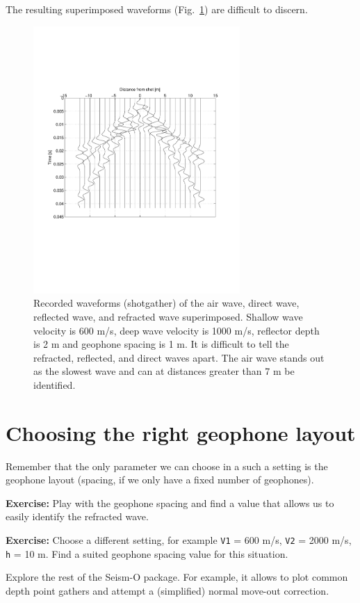 \documentclass[11pt]{article}
\begin{document}
The resulting superimposed waveforms (Fig.~\ref{allwaves}) are
difficult to discern.

\begin{figure}
  \centering
  \includegraphics[width=0.7\textwidth, trim = 1cm 7.5cm 2cm
    6cm,clip]{figures/AllWaves.pdf}
  \caption{\label{allwaves} Recorded waveforms (shotgather) of the air
    wave, direct wave, reflected wave, and refracted wave
    superimposed. Shallow wave velocity is 600 m/s, deep wave velocity
    is 1000 m/s, reflector depth is 2 m and geophone spacing is 1
    m. It is difficult to tell the refracted, reflected, and direct
    waves apart. The air wave stands out as the slowest wave and can
    at distances greater than 7 m be identified.}
\end{figure}

\section{Choosing the right geophone layout}

Remember that the only parameter we can choose in a such a setting is
the geophone layout (spacing, if we only have a fixed number of
geophones).

\textbf{Exercise:} Play with the geophone spacing and find a value
that allows us to easily identify the refracted wave.

\textbf{Exercise:} Choose a different setting, for example \verb#V1# =
600 m/s, \verb#V2# = 2000 m/s, \verb#h# = 10 m. Find a suited geophone
spacing value for this situation.

Explore the rest of the Seism-O package. For example, it allows to
plot common depth point gathers and attempt a (simplified) normal
move-out correction.
\end{document}
